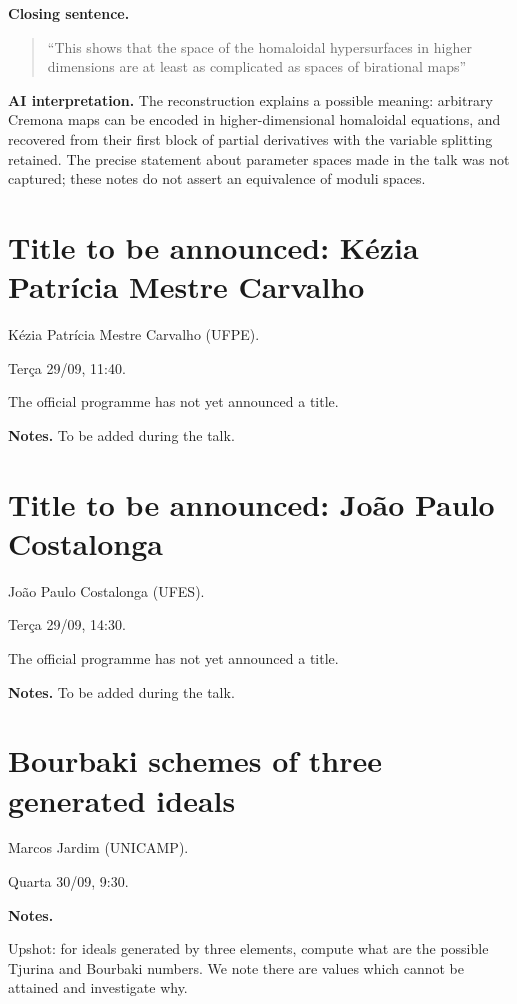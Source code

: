 \medskip\noindent
\textbf{Closing sentence.}
\begin{quote}
``This shows that the space of the
homaloidal hypersurfaces in higher
dimensions are at least as complicated
as spaces of birational maps''
\end{quote}
\textbf{AI interpretation.}
The reconstruction explains a possible
meaning: arbitrary Cremona maps can be
encoded in higher-dimensional homaloidal
equations, and recovered from their first
block of partial derivatives with the
variable splitting retained.
The precise statement about parameter
spaces made in the talk was not captured;
these notes do not assert an equivalence
of moduli spaces.

\section{Title to be announced: Kézia
Patrícia
Mestre Carvalho}
\label{section-kezia-carvalho}

Kézia Patrícia Mestre Carvalho (UFPE).

Terça 29/09, 11:40.

The official programme has not yet
announced a title.

\medskip\noindent
\textbf{Notes.}
To be added during the talk.

\section{Title to be announced: João Paulo
Costalonga}
\label{section-joao-costalonga}

João Paulo Costalonga (UFES).

Terça 29/09, 14:30.

The official programme has not yet
announced a title.

\medskip\noindent
\textbf{Notes.}
To be added during the talk.

\section{Bourbaki schemes of three generated
ideals}
\label{section-marcos-jardim}

Marcos Jardim (UNICAMP).

Quarta 30/09, 9:30.

\medskip\noindent
\textbf{Notes.}

Upshot: for ideals generated by three
elements, compute what are the possible
Tjurina and Bourbaki numbers. We note there
are values which cannot be attained and
investigate why.

